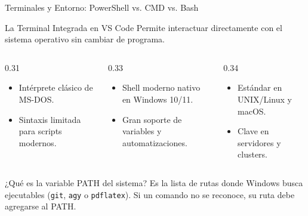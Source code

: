 \documentclass[aspectratio=169, 10pt]{beamer}
\begin{document}
\begin{frame}{Terminales y Entorno: PowerShell vs. CMD vs. Bash}
  \begin{block}{La Terminal Integrada en VS Code}
    \small
    Permite interactuar directamente con el sistema operativo sin cambiar de programa.
  \end{block}

  \vspace{0.1cm}
  \begin{columns}[T]
    \begin{column}{0.31\textwidth}
      \begin{tcolorbox}[colback=white,colframe=pucpDarkGray,title=\textbf{CMD (Símbolo de Sistema)},fonttitle=\bfseries\tiny,boxrule=0.5pt,top=1.2mm,bottom=1.2mm]
        \tiny
        \begin{itemize}
          \item Intérprete clásico de MS-DOS.
          \item Sintaxis limitada para scripts modernos.
        \end{itemize}
      \end{tcolorbox}
    \end{column}

    \begin{column}{0.33\textwidth}
      \begin{tcolorbox}[colback=pucpLightBlue!40,colframe=pucpBlue,title=\textbf{PowerShell (Recomendado)},fonttitle=\bfseries\tiny,boxrule=0.5pt,top=1.2mm,bottom=1.2mm]
        \tiny
        \begin{itemize}
          \item Shell moderno nativo en Windows 10/11.
          \item Gran soporte de variables y automatizaciones.
        \end{itemize}
      \end{tcolorbox}
    \end{column}

    \begin{column}{0.34\textwidth}
      \begin{tcolorbox}[colback=white,colframe=pucpMidBlue,title=\textbf{Git Bash / Linux Shell},fonttitle=\bfseries\tiny,boxrule=0.5pt,top=1.2mm,bottom=1.2mm]
        \tiny
        \begin{itemize}
          \item Estándar en UNIX/Linux y macOS.
          \item Clave en servidores y clusters.
        \end{itemize}
      \end{tcolorbox}
    \end{column}
  \end{columns}

  \vspace{0.15cm}
  \begin{alertblock}{¿Qué es la variable PATH del sistema?}
    \small
    Es la lista de rutas donde Windows busca ejecutables (\texttt{git}, \texttt{agy} o \texttt{pdflatex}). Si un comando no se reconoce, su ruta debe agregarse al PATH.
  \end{alertblock}
\end{frame}
\end{document}
